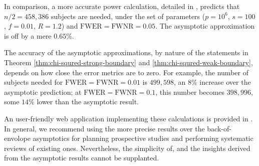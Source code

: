 In comparison, a more accurate power calculation, detailed in \cite{gao2019upass}, predicts that $n / 2 = 458,386$ subjects are needed, under the set of parameters ($p=10^6$, $s=100$, $f=0.01$, $R=1.2$) and $\mathrm{FWER}=\mathrm{FWNR}=0.05$.
The asymptotic approximation is off by a mere $0.65\%$.

The accuracy of the asymptotic approximations, by nature of the statements in Theorem \ref{thm:chi-squred-strong-boundary} and \ref{thm:chi-squred-weak-boundary}, depends on how close the error metrics are to zero.
For example, the number of subjects needed for $\mathrm{FWER}=\mathrm{FWNR}=0.01$ is $499,598$, an $8\%$ increase over the asymptotic prediction; at $\mathrm{FWER}=\mathrm{FWNR}=0.1$, this number becomes $398,996$, some $14\%$ lower than the asymptotic result.

An user-friendly web application implementing these calculations is provided in \cite{gao2019upass}.
In general, we recommend using the more precise results over the back-of-envolope asymptotics for planning prospective studies and performing systematic reviews of existing ones.
Nevertheless, the simplicity of, and the insights derived from the asymptotic results cannot be supplanted.
